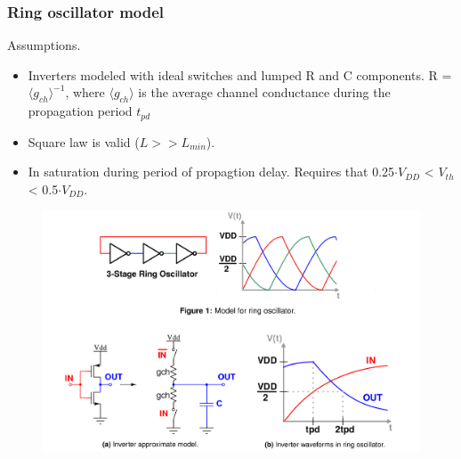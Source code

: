 \documentclass[t, screen, aspectratio=43]{beamer}
\begin{document}
\begin{frame}
	\frametitle{Ring oscillator model}
	\begin{block}{Assumptions.}
		\begin{minipage}{4cm}
			\vspace{1em}
			\tiny
		\begin{itemize}[itemsep=4pt,label=\protect---]
			\tiny
			\item Inverters modeled with ideal switches and lumped R and C components. R = $\langle g_{ch}\rangle^{-1}$, where $\langle g_{ch}\rangle$ is the average channel conductance during the propagation period $t_{pd}$
			\item Square law is valid ($L>>L_{min}$).
			\item In saturation during period of propagtion delay. Requires that 0.25$\cdot V_{DD}$ < $V_{th}$ < 0.5$\cdot V_{DD}$.
		\end{itemize}    

		\end{minipage}%
		\begin{minipage}{8cm}
			\begin{figure}[htb!]
			        \centering
			        \center\includegraphics[width=1\linewidth]{ro_model_fig.png}
			\end{figure}
		\end{minipage}%

	\end{block}	
\end{frame}
\end{document}
